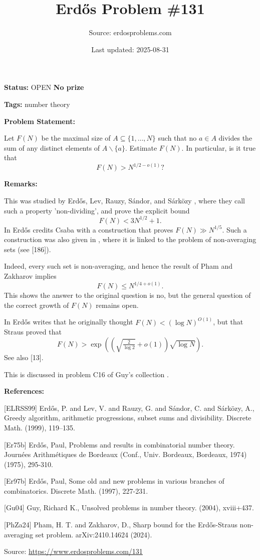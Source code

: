 \documentclass{article}
\title{Erd\H{o}s Problem \#131}
\date{Last updated: 2025-08-31}
\author{Source: erdosproblems.com}
\begin{document}
\maketitle

\noindent\textbf{Status:} OPEN \quad \textbf{No prize}

\noindent\textbf{Tags:} number theory

\medskip
\noindent\textbf{Problem Statement:}

Let $F(N)$ be the maximal size of $A\subseteq\{1,\ldots,N\}$ such that no $a\in A$ divides the sum of any distinct elements of $A\backslash\{a\}$. Estimate $F(N)$. In particular, is it true that\[F(N) > N^{1/2-o(1)}?\]

\bigskip
\noindent\textbf{Remarks:}

This was studied by Erd\H{o}s, Lev, Rauzy, S\'{a}ndor, and S\'{a}rk\"{o}zy \cite{ELRSS99}, where they call such a property 'non-dividing', and prove the explicit bound\[F(N)<3N^{1/2}+1.\]In \cite{Er97b} Erd\H{o}s credits Csaba with a construction that proves $F(N) \gg N^{1/5}$. Such a construction was also given in \cite{ELRSS99}, where it is linked to the problem of non-averaging sets (see [186]).

Indeed, every such set is non-averaging, and hence the result of Pham and Zakharov \cite{PhZa24} implies\[F(N) \leq N^{1/4+o(1)}.\]This shows the answer to the original question is no, but the general question of the correct growth of $F(N)$ remains open.

In \cite{Er75b} Erd\H{o}s writes that he originally thought $F(N) <(\log N)^{O(1)}$, but that Straus proved that\[F(N) > \exp((\sqrt{\tfrac{2}{\log 2}}+o(1))\sqrt{\log N}).\]See also [13].

This is discussed in problem C16 of Guy's collection \cite{Gu04}.

\bigskip
\noindent\textbf{References:}

[ELRSS99] Erd\H{o}s, P. and Lev, V. and Rauzy, G. and S\'{a}ndor, C. and
S\'{a}rk\"ozy, A., Greedy algorithm, arithmetic progressions, subset sums and
divisibility. Discrete Math. (1999), 119--135.
 
 [Er75b] Erd\H{o}s, Paul, Problems and results in combinatorial number theory. Journ\'{e}es Arithm\'{e}tiques de Bordeaux (Conf., Univ. Bordeaux, Bordeaux, 1974) (1975), 295-310.
 
 [Er97b] Erd\H{o}s, Paul, Some old and new problems in various branches of combinatorics. Discrete Math. (1997), 227-231.
 
 [Gu04] Guy, Richard K., Unsolved problems in number theory. (2004), xviii+437.
 
 [PhZa24] Pham, H. T. and Zakharov, D., Sharp bound for the Erd\H{o}s-Straus non-averaging set problem. arXiv:2410.14624 (2024).

\bigskip
\noindent\small{Source: \url{https://www.erdosproblems.com/131}}
\end{document}
